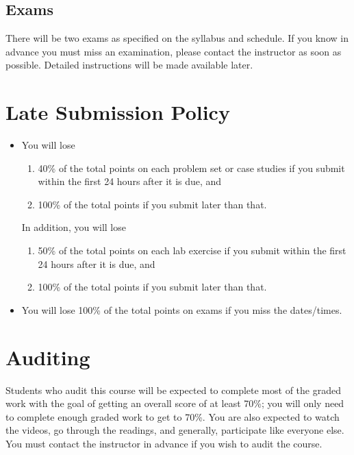 \documentclass[11pt, a4paper]{article}
\begin{document}
\subsection{Exams}
There will be two exams as specified on the syllabus and schedule. If you know in advance you must miss an examination, please contact the instructor as soon as possible. Detailed instructions will be made available later.


\section{Late Submission Policy} 
\begin{itemize}
	\item You will lose
	\begin{enumerate}
		\item 40\% of the total points on each problem set or case studies if you submit within the first 24 hours after it is due, and
		\item 100\% of the total points if you submit later than that.
	\end{enumerate}
	
	In addition, you will lose 
	\begin{enumerate}
		\item 50\% of the total points on each lab exercise if you submit within the first 24 hours after it is due, and
		\item 100\% of the total points if you submit later than that.
	\end{enumerate}
	
	\item You will lose 100\% of the total points on exams if you miss the dates/times.
\end{itemize}


\section{Auditing}
Students who audit this course will be expected to complete most of the graded work with the goal of getting an overall score of at least 70\%; you will only need to complete enough graded work to get to 70\%. You are also expected to watch the videos, go through the readings, and generally, participate like everyone else. You must contact the instructor in advance if you wish to audit the course.
\end{document}
